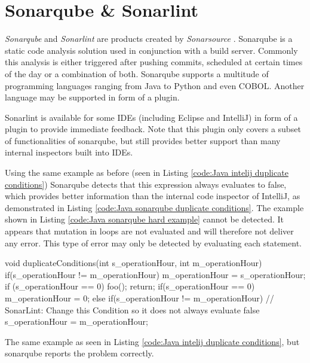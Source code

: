 \section{Sonarqube \& Sonarlint} %
\label{sec:sonar}
\emph{Sonarqube} \cite{sonarqube} and \emph{Sonarlint} \cite{SonarLintFixIssues} are products created by \emph{Sonarsource} \cite{CodeQualityCode}. Sonarqube is a static code analysis solution used in conjunction with a build server.
Commonly this analysis is either triggered after pushing commits, scheduled at certain times of the day or a combination of both.
Sonarqube supports a multitude of programming languages ranging from Java to Python and even COBOL. Another language may be supported in form of a plugin.


Sonarlint is available for some IDEs (including Eclipse and IntelliJ) in form of a plugin to provide immediate feedback. Note that this plugin only covers a subset of functionalities of sonarqube, but still provides better support than many internal inspectors built into IDEs.

\newpage

Using the same example as before (seen in Listing \ref{code:Java intelij duplicate conditions}) Sonarqube detects that this expression always evaluates to false, which provides better information than the internal code inspector of IntelliJ, as demonstrated in Listing \ref{code:Java sonarqube duplicate conditions}. The example shown in Listing \ref{code:Java sonarqube hard example} cannot be detected. It appears that mutation in loops are not evaluated and will therefore not deliver any error. This type of error may only be detected by evaluating each statement.


\begin{program}[h!]
	\begin{JavaCode}
void duplicateConditions(int s_operationHour, int m_operationHour) {
	if(s_operationHour != m_operationHour) {
		m_operationHour = s_operationHour;
		if (s_operationHour == 0) {
			foo();        
		}
		return;
	}
	if(s_operationHour == 0) {
		m_operationHour = 0;
	} else {
		if(s_operationHour != m_operationHour) { // SonarLint: Change this Condition so it does not always evaluate false
			s_operationHour = m_operationHour;
		}
	}
}\end{JavaCode}
	\caption{The same example as seen in Listing \ref{code:Java intelij duplicate conditions}, but sonarqube reports the problem correctly. }
	\label{code:Java sonarqube duplicate conditions}
\end{program}

